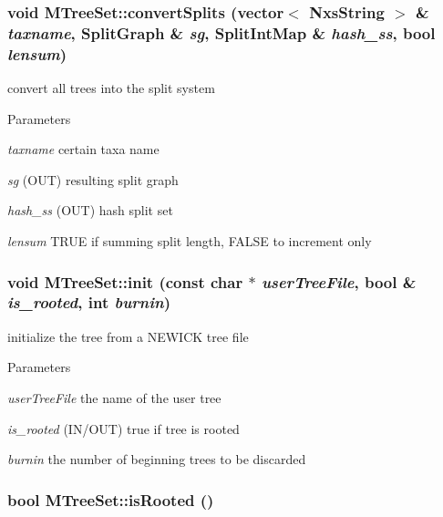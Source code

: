 \hypertarget{classMTreeSet_ae937b8a9957d096c14b2fa9364c6c660}{
\subsubsection[{convertSplits}]{\setlength{\rightskip}{0pt plus 5cm}void MTreeSet::convertSplits (vector$<$ {\bf NxsString} $>$ \& {\em taxname}, \/  {\bf SplitGraph} \& {\em sg}, \/  {\bf SplitIntMap} \& {\em hash\_\-ss}, \/  bool {\em lensum})}}
\label{classMTreeSet_ae937b8a9957d096c14b2fa9364c6c660}
convert all trees into the split system 
\begin{DoxyParams}{Parameters}
\item[{\em taxname}]certain taxa name \item[{\em sg}](OUT) resulting split graph \item[{\em hash\_\-ss}](OUT) hash split set \item[{\em lensum}]TRUE if summing split length, FALSE to increment only \end{DoxyParams}
\hypertarget{classMTreeSet_aef18c58d44d7f2fe2a9cf81e68e570cd}{
\subsubsection[{init}]{\setlength{\rightskip}{0pt plus 5cm}void MTreeSet::init (const char $\ast$ {\em userTreeFile}, \/  bool \& {\em is\_\-rooted}, \/  int {\em burnin})}}
\label{classMTreeSet_aef18c58d44d7f2fe2a9cf81e68e570cd}
initialize the tree from a NEWICK tree file 
\begin{DoxyParams}{Parameters}
\item[{\em userTreeFile}]the name of the user tree \item[{\em is\_\-rooted}](IN/OUT) true if tree is rooted \item[{\em burnin}]the number of beginning trees to be discarded \end{DoxyParams}
\hypertarget{classMTreeSet_a1788a15758d1c5292f05afb3b7920fbe}{
\subsubsection[{isRooted}]{\setlength{\rightskip}{0pt plus 5cm}bool MTreeSet::isRooted ()}}
\label{classMTreeSet_a1788a15758d1c5292f05afb3b7920fbe}
